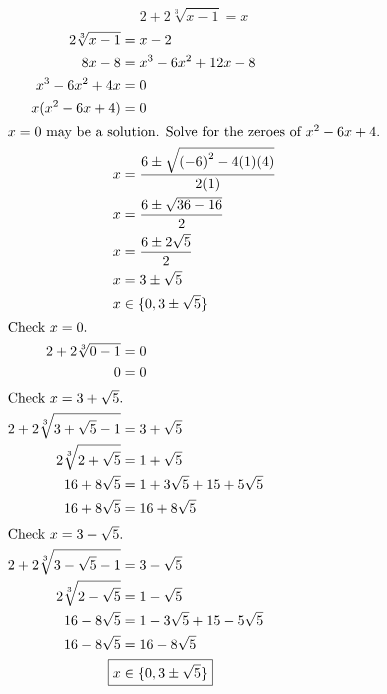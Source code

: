 	\subsection{}
		\[2 + 2\sqrt[3]{x - 1} = x\]
		\begin{align*}
			2\sqrt[3]{x - 1} &= x - 2 \\
			8x - 8 &= x^3 - 6x^2 + 12x - 8 \\
			x^3 - 6x^2 + 4x &= 0 \\
			x(x^2 - 6x + 4) &= 0 \\
			\intertext{$x = 0$ may be a solution. Solve for the zeroes of $x^2 - 6x + 4$.}
			x &= \frac{6 \pm \sqrt{{(-6)}^2 - 4(1)(4)}}{2(1)} \\
			x &= \frac{6 \pm \sqrt{36 - 16}}{2} \\
			x &= \frac{6 \pm 2\sqrt{5}}{2} \\
			x &= 3 \pm \sqrt{5} \\
			x &\in \{0, 3 \pm \sqrt{5}\} \\
			\intertext{Check $x = 0$.}
			2 + 2\sqrt[3]{0 - 1} &= 0 \\
			0 &= 0 \\
			\intertext{Check $x = 3 + \sqrt{5}$.}
			2 + 2\sqrt[3]{3 + \sqrt{5} - 1} &= 3 + \sqrt{5} \\
			2\sqrt[3]{2 + \sqrt{5}} &= 1 + \sqrt{5} \\
			16 + 8\sqrt{5} &= 1 + 3\sqrt{5} + 15 + 5\sqrt{5} \\
			16 + 8\sqrt{5} &= 16 + 8\sqrt{5} \\
			\intertext{Check $x = 3 - \sqrt{5}$.}
			2 + 2\sqrt[3]{3 - \sqrt{5} - 1} &= 3 - \sqrt{5} \\
			2\sqrt[3]{2 - \sqrt{5}} &= 1 - \sqrt{5} \\
			16 - 8\sqrt{5} &= 1 - 3\sqrt{5} + 15 - 5\sqrt{5} \\
			16 - 8\sqrt{5} &= 16 - 8\sqrt{5} \\
			\Aboxed{x &\in \{0, 3 \pm \sqrt{5}\}}
		\end{align*}
		\pagebreak{}

